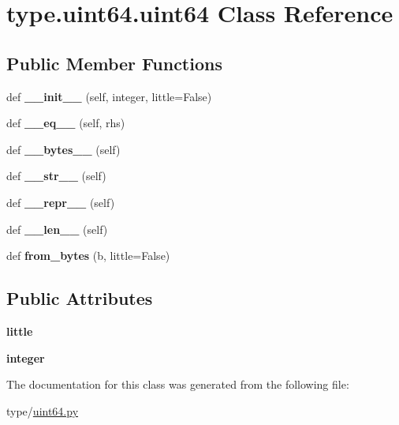 \hypertarget{classtype_1_1uint64_1_1uint64}{}\section{type.\+uint64.\+uint64 Class Reference}
\label{classtype_1_1uint64_1_1uint64}
\subsection*{Public Member Functions}
\begin{DoxyCompactItemize}
\item 
\mbox{\label{classtype_1_1uint64_1_1uint64_ae746cd5705ffa29e5009001a6ab2736f}} 
def {\bfseries \+\_\+\+\_\+init\+\_\+\+\_\+} (self, integer, little=False)
\item 
\mbox{\label{classtype_1_1uint64_1_1uint64_aa83ce7bf5c42d173039b06c4180f4988}} 
def {\bfseries \+\_\+\+\_\+eq\+\_\+\+\_\+} (self, rhs)
\item 
\mbox{\label{classtype_1_1uint64_1_1uint64_afa717a2d5a6fd48e0dd9262b62363e11}} 
def {\bfseries \+\_\+\+\_\+bytes\+\_\+\+\_\+} (self)
\item 
\mbox{\label{classtype_1_1uint64_1_1uint64_a7318ca50cf77f4121c583292479ea1df}} 
def {\bfseries \+\_\+\+\_\+str\+\_\+\+\_\+} (self)
\item 
\mbox{\label{classtype_1_1uint64_1_1uint64_a73450f9a128226e9b92b154c5f0fabd9}} 
def {\bfseries \+\_\+\+\_\+repr\+\_\+\+\_\+} (self)
\item 
\mbox{\label{classtype_1_1uint64_1_1uint64_a45b1bed50302370090cf93c8b38c5caa}} 
def {\bfseries \+\_\+\+\_\+len\+\_\+\+\_\+} (self)
\item 
\mbox{\label{classtype_1_1uint64_1_1uint64_a3de22b60f5887ff0c6f0156374713703}} 
def {\bfseries from\+\_\+bytes} (b, little=False)
\end{DoxyCompactItemize}
\subsection*{Public Attributes}
\begin{DoxyCompactItemize}
\item 
\mbox{\label{classtype_1_1uint64_1_1uint64_a370062f658a64670b279d27786b75a03}} 
{\bfseries little}
\item 
\mbox{\label{classtype_1_1uint64_1_1uint64_ac62fb45cd210f8fe4bf25922cf8f69bf}} 
{\bfseries integer}
\end{DoxyCompactItemize}


The documentation for this class was generated from the following file\+:\begin{DoxyCompactItemize}
\item 
type/\mbox{\hyperlink{uint64_8py}{uint64.\+py}}\end{DoxyCompactItemize}
